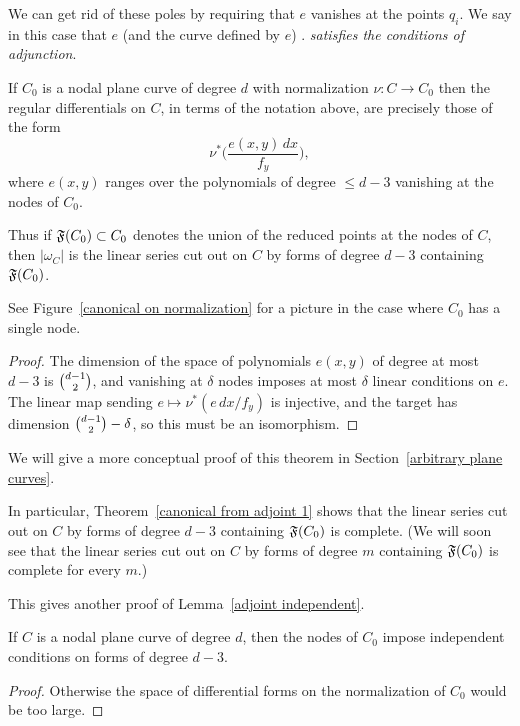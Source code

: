 We can get rid of these poles by requiring that $e$ vanishes at the
points $q_i$. We say in this case that $e$ (and the curve defined by $e$)
 .
\emph{satisfies the conditions of adjunction}.

\begin{theorem}\label{canonical from adjoint 1}
If $C_{0}$ is a nodal plane curve of degree $d$ with normalization $\nu:
C\to C_{0}$
then the  regular differentials on  $C$, in terms of the notation above,
 are precisely those of the form
 $$
\nu^{*}\biggl( \frac{e(x,y)\,dx}{f_{y}}\biggr)
,
$$
where
$e(x,y)$ ranges over the polynomials of degree $\leq d-3$
vanishing at the nodes of $C_{0}$.

Thus if $\adj(C_{0})\subset C_{0}$ denotes the union
of the reduced points at the nodes of $C$, then $|\omega_{C}|$ is the
linear series cut out on $C$ by
forms of degree $d-3$ containing $\adj(C_{0})$.
\unif
\end{theorem}

See Figure~\ref{canonical on normalization} for a picture in the case
where $C_0$ has a single node.
\begin{proof}
The dimension of the space of polynomials $e(x,y)$ of degree at most
$d-3$ is $\tbinom{d-1}{2}$,
and vanishing at $\delta$ nodes imposes at most $\delta$ linear conditions
on $e$. The linear map sending
$e\mapsto \nu^{*}(e\,dx/f_{y})$ is injective, and the target has dimension
$\tbinom{d-1}{2}-\delta$, so this must be an isomorphism.
\end{proof}
We will give a more conceptual proof of this theorem in
Section~\ref{arbitrary plane curves}.

In particular, Theorem~\ref{canonical from adjoint 1}
shows that the linear series cut out on $C$ by
forms of degree $d-3$ containing $\adj(C_{0})$ is complete. (We will
soon see that
 the linear series cut out on $C$ by
forms of degree $m$ containing $\adj(C_{0})$ is complete for every $m$.)


This gives another proof of Lemma~\ref{adjoint independent}.

\begin{corollary}
If $C$ is a nodal plane curve of degree $d$, then the nodes of $C_{0}$
impose independent
%
conditions on forms of degree $d-3$.
\unif
\end{corollary}

\begin{proof}
 Otherwise the space of differential forms on the normalization of $C_{0}$
 would be too large.
\end{proof}

